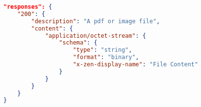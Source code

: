 \begin{minipage}{\textwidth}
\begin{lstlisting}[caption={Response returning a file},label={code:binaryinresponse},language=json]
"responses": {
    "200": {
        "description": "A pdf or image file",
        "content": {
            "application/octet-stream": {
                "schema": {
                    "type": "string",
                    "format": "binary",
                    "x-zen-display-name": "File Content"
                }
            }
        }
    }
}
\end{lstlisting}
\end{minipage}